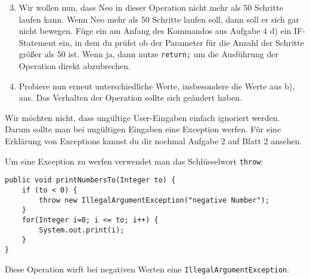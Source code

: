 \begin{enumerate}\setcounter{enumi}{2}
	\item
		Wir wollen nun, dass Neo in dieser Operation nicht mehr als 50 Schritte laufen kann.
		Wenn Neo mehr als 50 Schritte laufen soll, dann soll er sich gar nicht bewegen.
		Füge ein am Anfang des Kommandos aus Aufgabe 4 d) ein IF-Statement ein, in dem du prüfst ob der Parameter für die Anzahl der Schritte größer als 50 ist.
		Wenn ja, dann nutze \lstinline{return;} um die Ausführung der Operation direkt abzubrechen.

	\item
		Probiere nun erneut unterschiedliche Werte, insbesondere die Werte aus b), aus.
		Das Verhalten der Operation sollte sich geändert haben.
\end{enumerate}

\medskip %

\begin{Infobox}
	Wir möchten nicht, dass ungültige User-Eingaben einfach ignoriert werden.
	Darum sollte man bei ungültigen Eingaben eine Exception werfen.
	Für eine Erklärung von Exceptions kannst du dir nochmal Aufgabe 2 auf Blatt 2 ansehen.\newline

	Um eine Exception zu werfen verwendet man das Schlüsselwort \lstinline{throw}:

	\begin{lstlisting}[xleftmargin=0.5cm]
public void printNumbersTo(Integer to) {
    if (to < 0) {
        throw new IllegalArgumentException("negative Number");
    }
    for(Integer i=0; i <= to; i++) {
        System.out.print(i);
    }
}
	\end{lstlisting}

	Diese Operation wirft bei negativen Werten eine \lstinline{IllegalArgumentException}.
\end{Infobox}


